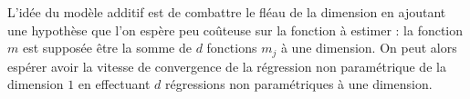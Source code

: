 {
    L'idée du modèle additif est de combattre le fléau de la dimension en ajoutant une hypothèse que l'on espère peu coûteuse sur la fonction à estimer : la fonction $m$ est supposée être la somme de $d$ fonctions $m_j$ à une dimension. On peut alors espérer avoir la vitesse de convergence de la régression non paramétrique de la dimension $1$ en effectuant $d$ régressions non paramétriques à une dimension. 




}


